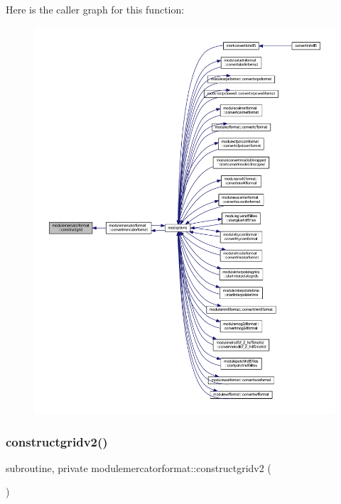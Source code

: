 Here is the caller graph for this function\+:\nopagebreak
\begin{figure}[H]
\begin{center}
\leavevmode
\includegraphics[width=350pt]{namespacemodulemercatorformat_abe7eddb3220bab2097cf2622ced34f57_icgraph}
\end{center}
\end{figure}
\mbox{\label{namespacemodulemercatorformat_ab1d75b183b32a1b3d634bf12fcf66303}} 
\subsubsection{\texorpdfstring{constructgridv2()}{constructgridv2()}}
{\footnotesize\ttfamily subroutine, private modulemercatorformat\+::constructgridv2 (\begin{DoxyParamCaption}{ }\end{DoxyParamCaption})\hspace{0.3cm}{\ttfamily [private]}}


